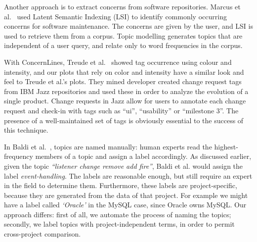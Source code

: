 \documentclass[smallextended]{svjour3}       %
\begin{document}
Another approach is to extract concerns from software repositories.
Marcus et al.~\cite{marcus04wcre} used Latent Semantic Indexing (LSI)
to identify commonly occurring concerns for software maintenance. 
The
concerns are given by the user, and LSI is used to retrieve them from
a corpus. 
Topic modelling generates topics that are independent of a user query, and relate only to word frequencies in the corpus.

With ConcernLines, Treude et al.~\cite{treude09cl} showed tag occurrence
using colour and intensity, and our plots that rely on color and intensity
have a similar look and feel to Treude et al.'s plots.
They mined
developer created 
change request tags from IBM Jazz
repositories and used these 
in order to analyze the evolution of a single product.
Change requests in Jazz allow for users to annotate each change
request and check-in with tags such as ``ui'', ``usability'' or
``milestone 3''. 
The presence of a well-maintained set of tags is obviously essential to the success of this technique.


In Baldi et al.~\cite{Baldi2008}, topics are named manually: human
experts read the highest-frequency members of a topic and assign a
label accordingly. 
As discussed earlier, given the topic \emph{``listener change remove add fire''}, Baldi et al. would assign the label \emph{event-handling}. 
The labels are reasonable enough, but still require an expert in the field to determine them. 
Furthermore, these labels are project-specific, because they are
generated from the data of that project. For example we might have a label called \emph{`Oracle'}
in the MySQL case, since Oracle owns MySQL. 
Our approach differs: first of all, we automate the process of naming the topics; secondly, we label topics with project-independent terms, in order
to permit cross-project comparison.
\end{document}
